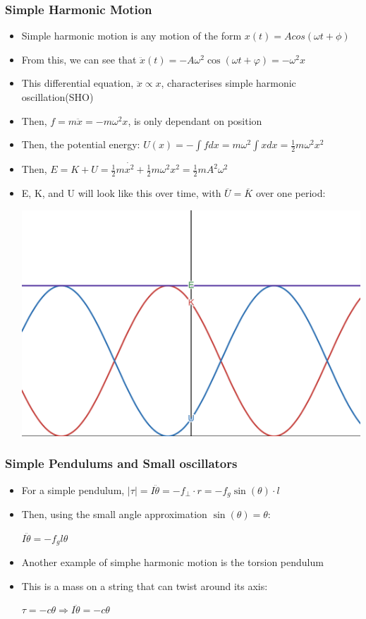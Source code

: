 \documentclass{article}
\begin{document}
\subsubsection*{Simple Harmonic Motion}

\begin{itemize}
    \item Simple harmonic motion is any motion of the form \(x(t) = Acos(\omega t + \phi)\)
    \item From this, we can see that \(\ddot x(t) = -A\omega^2\cos(\omega t+\varphi) = -\omega^2x\)
    \item This differential equation, \(\ddot x \propto x\), characterises simple harmonic oscillation(SHO)
    \item Then, \(f =m\ddot x = -m\omega^2x\), is only dependant on position
    \item Then, the potential energy: \(U(x) = -\int f dx = m\omega^2\int x dx=\frac{1}{2}m\omega^2x^2\)
    \item Then, \(E = K + U = \frac{1}{2}m\dot{x^2} + \frac{1}{2}m\omega^2x^2 = \frac{1}{2}mA^2\omega^2\)
    \item E, K, and U will look like this over time, with \(\overline{U} = \overline{K}\) over one period:
    
    \includegraphics[width = 0.5\linewidth]{year1/wfmp/periodic-motion/osciltor-energy.png}
\end{itemize}


\subsubsection*{Simple Pendulums and Small oscillators}

\begin{itemize}
    \item For a simple pendulum, \(|\tau|=I\ddot{\theta}=-f_{\perp}\cdot r = -f_g\sin(\theta)\cdot l\)
    \item Then, using the small angle approximation \(\sin(\theta) = \theta\):
    
    \(I\ddot{\theta}=-f_g l\theta\)
 
    \item Another example of simphe harmonic motion is the torsion pendulum
    \item This is a mass on a string that can twist around its axis:
    
    \(\tau=-c\theta\Rightarrow I\ddot\theta=-c\theta\)
    
\end{itemize}
\end{document}
